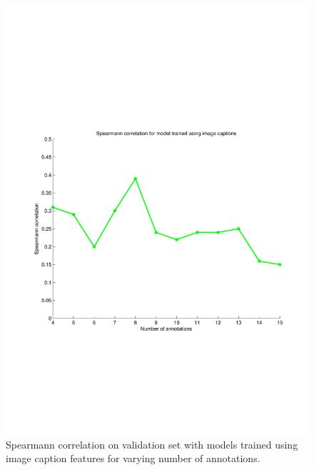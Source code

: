 \documentclass[sigconf]{acmart}
\begin{document}
\begin{figure}[h]	  
  \centering
    \includegraphics[width=0.7\columnwidth]{figures/annotations.pdf}
		\caption{Spearmann correlation on validation set with models trained using image caption features for varying number of annotations.}
    \label{num-ann}
\end{figure}
\end{document}
